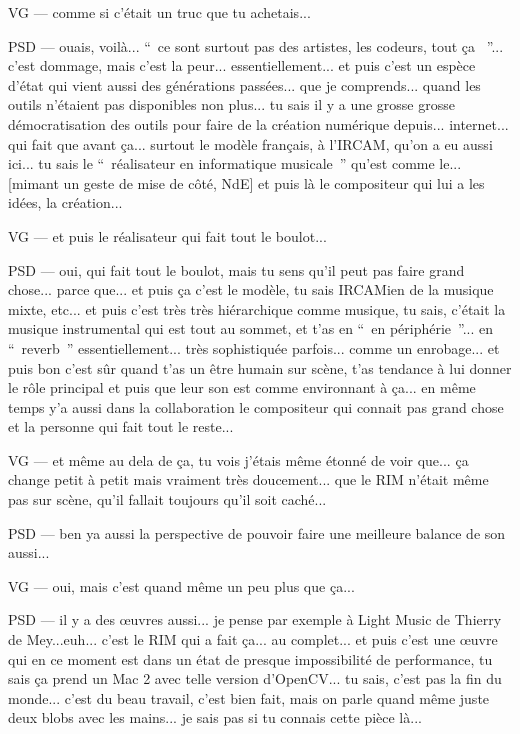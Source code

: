 VG — comme si c'était un truc que tu achetais...

PSD — ouais, voilà... “ ce sont surtout pas des artistes, les codeurs, tout ça  ”... c'est dommage, mais c'est la peur... essentiellement... et puis c'est un espèce d'état qui vient aussi des générations passées... que je comprends... quand les outils n'étaient pas disponibles non plus... tu sais il y a une grosse grosse démocratisation des outils pour faire de la création numérique depuis... internet... qui fait que avant ça... surtout le modèle français, à l'\gls{IRCAM}, qu'on a eu aussi ici... tu sais le “ réalisateur en informatique musicale ” qu'est comme le... [mimant un geste de mise de côté, NdE] et puis là le compositeur qui lui a les idées, la création...

VG — et puis le réalisateur qui fait tout le boulot...

PSD — oui, qui fait tout le boulot, mais tu sens qu'il peut pas faire grand chose... parce que... et puis ça c'est le modèle, tu sais IRCAMien de la musique mixte, etc... et puis c'est très très hiérarchique comme musique, tu sais, c'était la musique instrumental qui est tout au sommet, et t'as en “ en périphérie ”... en “ reverb ” essentiellement... très sophistiquée parfois... comme un enrobage... et puis bon c'est sûr quand t'as un être humain sur scène, t'as tendance à lui donner le rôle principal et puis que leur son est comme environnant à ça... en même temps y'a aussi dans la collaboration le compositeur qui connait pas grand chose et la personne qui fait tout le reste...

VG — et même au dela de ça, tu vois j'étais même étonné de voir que... ça change petit à petit mais vraiment très doucement... que le RIM n'était même pas sur scène, qu'il fallait toujours qu'il soit caché...

PSD — ben ya aussi la perspective de pouvoir faire une meilleure balance de son aussi...

VG — oui, mais c'est quand même un peu plus que ça...

PSD — il y a des œuvres aussi... je pense par exemple à Light Music de Thierry de Mey...euh... c'est le RIM qui a fait ça... au complet... et puis c'est une œuvre qui en ce moment est dans un état de presque impossibilité de performance, tu sais ça prend un Mac 2 avec telle version d'OpenCV... tu sais, c'est pas la fin du monde... c'est du beau travail, c'est bien fait, mais on parle quand même juste deux blobs avec les mains... je sais pas si tu connais cette pièce là...

